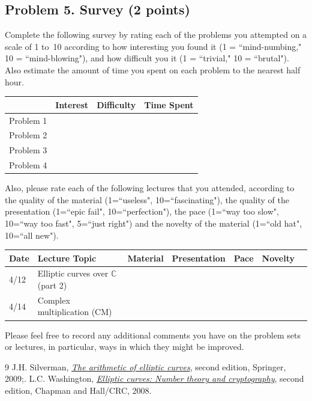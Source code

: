 \documentclass[11pt]{article}
\newcommand{\C}{\mathbb{C}}
\begin{document}
\subsection*{Problem 5. Survey (2 points)}

Complete the following survey by rating each of the problems you attempted on a scale of 1 to~10 according to how interesting you found it (1 = ``mind-numbing," 10 = ``mind-blowing"), and how difficult you it (1 = ``trivial," 10 = ``brutal").  Also estimate the amount of time you spent on each problem to the nearest half hour.

\begin{center}
\begin{tabular}{l|r|r|r|}
& Interest & Difficulty & Time Spent\\\hline
Problem 1 & & & \\\hline
Problem 2 & & & \\\hline
Problem 3 & & & \\\hline
Problem 4 & & & \\\hline
\end{tabular}
\end{center}
\noindent
Also, please rate each of the following lectures that you attended, according to the quality of the material (1=``useless", 10=``fascinating"), the quality of the presentation (1=``epic fail", 10=``perfection"), the pace (1=``way too slow", 10=``way too fast", 5=``just right") and the novelty of the material (1=``old hat", 10=``all new").

\begin{center}
\begin{tabular}{l|l|r|r|r|r|r}
Date & Lecture Topic & Material & Presentation & Pace & Novelty\\\hline
4/12 & Elliptic curves over $\C$ (part 2) & & & & \\\hline 
4/14 & Complex multiplication (CM) & & & & \\\hline 
\end{tabular}
\end{center}

\noindent
Please feel free to record any additional comments you have on the problem sets or lectures, in particular, ways in which they might be improved.

\begin{thebibliography}{9}
 J.H. Silverman, \href{https://link.springer.com/book/10.1007/978-0-387-09494-6}{\textit{The arithmetic of elliptic curves}}, second edition, Springer, 2009;.
 L.C. Washington, \href{https://doi.org/10.1201/9781420071474}{\textit{Elliptic curves: Number theory and cryptography}}, second edition, Chapman and Hall/CRC, 2008. 
\end{thebibliography}
\end{document}
